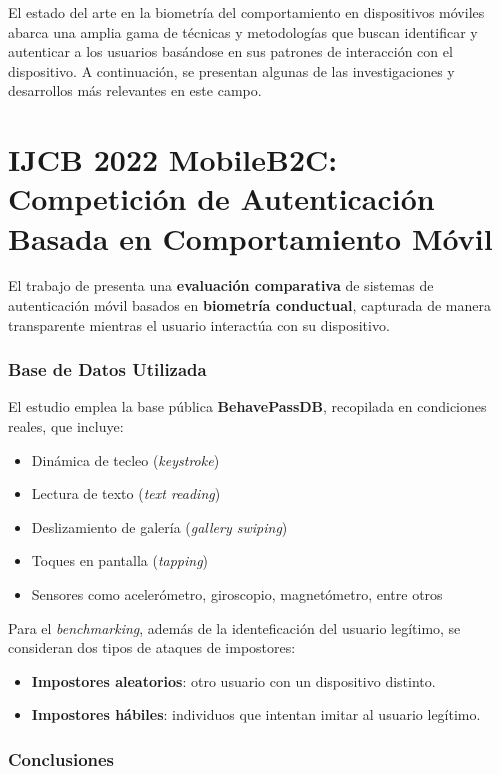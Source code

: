 El estado del arte en la biometría del comportamiento en dispositivos móviles abarca una amplia gama de técnicas y 
metodologías que buscan identificar y autenticar a los usuarios basándose en sus patrones de interacción con el 
dispositivo. 
A continuación, se presentan algunas de las investigaciones y desarrollos más relevantes en este campo. 

\section{IJCB 2022 MobileB2C: Competición de Autenticación Basada en Comportamiento Móvil}


El trabajo de \cite{stragapede2022ijcb2022mobilebehavioral} presenta una \textbf{evaluación comparativa} de sistemas de autenticación móvil basados en \textbf{biometría conductual}, capturada de manera transparente mientras el usuario interactúa con su dispositivo.

\subsubsection{Base de Datos Utilizada}

El estudio emplea la base pública \textbf{BehavePassDB}, recopilada en condiciones reales, que incluye:
\begin{itemize}
    \item Dinámica de tecleo (\textit{keystroke})
    \item Lectura de texto (\textit{text reading})
    \item Deslizamiento de galería (\textit{gallery swiping})
    \item Toques en pantalla (\textit{tapping})
    \item Sensores como acelerómetro, giroscopio, magnetómetro, entre otros
\end{itemize}
Para el \textit{benchmarking}, además de la identeficación del usuario legítimo, se consideran dos tipos de ataques de impostores:
\begin{itemize}
    \item \textbf{Impostores aleatorios}: otro usuario con un dispositivo distinto.
    \item \textbf{Impostores hábiles}: individuos que intentan imitar al usuario legítimo.
\end{itemize}
\subsubsection{Conclusiones}

